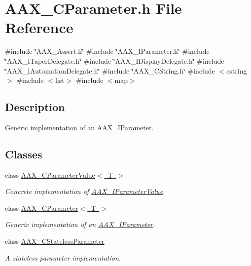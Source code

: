 \hypertarget{a00455}{}\section{A\+A\+X\+\_\+\+C\+Parameter.\+h File Reference}
\label{a00455}
{\ttfamily \#include \char`\"{}A\+A\+X\+\_\+\+Assert.\+h\char`\"{}}\newline
{\ttfamily \#include \char`\"{}A\+A\+X\+\_\+\+I\+Parameter.\+h\char`\"{}}\newline
{\ttfamily \#include \char`\"{}A\+A\+X\+\_\+\+I\+Taper\+Delegate.\+h\char`\"{}}\newline
{\ttfamily \#include \char`\"{}A\+A\+X\+\_\+\+I\+Display\+Delegate.\+h\char`\"{}}\newline
{\ttfamily \#include \char`\"{}A\+A\+X\+\_\+\+I\+Automation\+Delegate.\+h\char`\"{}}\newline
{\ttfamily \#include \char`\"{}A\+A\+X\+\_\+\+C\+String.\+h\char`\"{}}\newline
{\ttfamily \#include $<$cstring$>$}\newline
{\ttfamily \#include $<$list$>$}\newline
{\ttfamily \#include $<$map$>$}\newline


\subsection{Description}
Generic implementation of an \mbox{\hyperlink{a01857}{A\+A\+X\+\_\+\+I\+Parameter}}. 

\subsection*{Classes}
\begin{DoxyCompactItemize}
\item 
class \mbox{\hyperlink{a01533}{A\+A\+X\+\_\+\+C\+Parameter\+Value$<$ T $>$}}
\begin{DoxyCompactList}\small\item\em Concrete implementation of \mbox{\hyperlink{a01853}{A\+A\+X\+\_\+\+I\+Parameter\+Value}}. \end{DoxyCompactList}\item 
class \mbox{\hyperlink{a01537}{A\+A\+X\+\_\+\+C\+Parameter$<$ T $>$}}
\begin{DoxyCompactList}\small\item\em Generic implementation of an \mbox{\hyperlink{a01857}{A\+A\+X\+\_\+\+I\+Parameter}}. \end{DoxyCompactList}\item 
class \mbox{\hyperlink{a01541}{A\+A\+X\+\_\+\+C\+Stateless\+Parameter}}
\begin{DoxyCompactList}\small\item\em A stateless parameter implementation. \end{DoxyCompactList}\end{DoxyCompactItemize}
